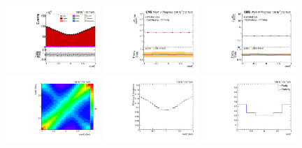 \begin{refsection}
\begin{figure}[htb]
\begin{center}
 \includegraphics[width=0.32\textwidth]{fig_fullRun2UL/controlplots/combined/Hyp_AntiLeptonBn.pdf}
 \includegraphics[width=0.32\textwidth]{fig_fullRun2UL/unfolding/combined/UnfoldedResults_b1n.pdf}
 \includegraphics[width=0.32\textwidth]{fig_fullRun2UL/unfolding/combined/UnfoldedResultsNorm_b1n.pdf} \\
 \includegraphics[width=0.32\textwidth]{fig_fullRun2UL/unfolding/combined/ResponseMatrix_b1n.pdf}
 \includegraphics[width=0.32\textwidth]{fig_fullRun2UL/unfolding/combined/TotEff_b1n.pdf}
 \includegraphics[width=0.32\textwidth]{fig_fullRun2UL/unfolding/combined/PurStab_b1n.pdf} \\

\end{center}
\end{figure}
\end{refsection}
